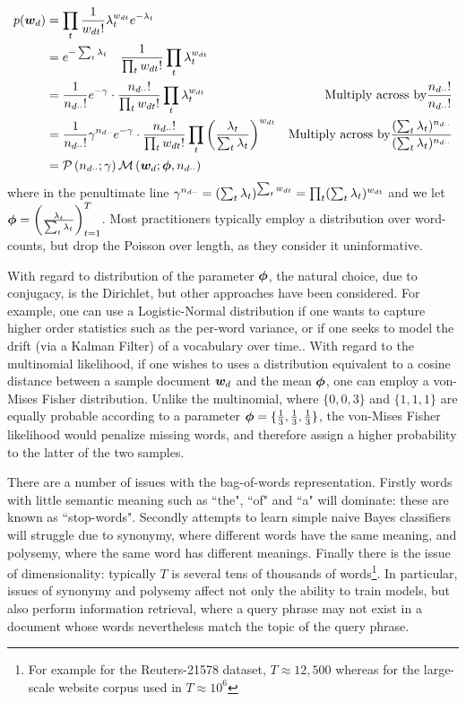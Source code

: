 \begin{align*}
p({ \bm w_d }) & = \prod_t \frac{1}{ {{ w_{dt} }!} } \lambda_t^{ w_{dt} } e^{-\lambda_t} \\
 &= e^{-\sum_t \lambda_t} \quad \frac{1}{ {\prod_t { w_{dt} }!} } \prod_t \lambda_t^{ w_{dt} } \\
&= \frac{1}{ {{ n_{d\cdot\cdot} } !} } e^{-\gamma} \cdot  \frac{{ n_{d\cdot\cdot} } !}{\prod_t { w_{dt} }!} \prod_t \lambda_t^{ w_{dt} } & \text{Multiply across by}\frac{{ n_{d\cdot\cdot} }!}{{ n_{d\cdot\cdot} }!} \\
&= \frac{1}{ {{ n_{d\cdot\cdot} } !} } \gamma^{ n_{d\cdot\cdot} } e^{-\gamma} \cdot  \frac{{ n_{d\cdot\cdot} } !}{\prod_t { w_{dt} }!} \prod_t \left(\frac{\lambda_t}{\sum_t \lambda_t}\right)^{ w_{dt} } & \text{Multiply across by}\frac{(\sum_t \lambda_t)^{ n_{d\cdot\cdot} }}{(\sum_t \lambda_t)^{ n_{d\cdot\cdot} }} \\
&= \mathcal{P}\left({ n_{d\cdot\cdot} }; \gamma\right) \mathcal{M}\left({ \bm w_d }; \bm \phi, { n_{d\cdot\cdot} }\right)
\end{align*}
where in the penultimate line $\gamma^{ n_{d\cdot\cdot} } = (\sum_t \lambda_t)^{\sum_t { w_{dt} }} = \prod_t (\sum_t \lambda_t)^{ w_{dt} }$ and we let $\bm \phi = \left(\frac{\lambda_t}{\sum_t \lambda_t}\right)_{t=1}^T$. Most practitioners typically employ a distribution over word-counts, but drop the Poisson over length, as they consider it uninformative.

With regard to distribution of the parameter $\bm \phi$, the natural choice, due to conjugacy, is the Dirichlet, but other approaches have been considered. For example, one can use a Logistic-Normal distribution if one wants to capture higher order statistics such as the per-word variance, or if one seeks to model the drift (via a Kalman Filter) of a vocabulary over time.\cite{Blei2006a}. With regard to the multinomial likelihood, if one wishes to uses a distribution equivalent to a cosine distance between a sample document ${ \bm w_d }$ and the mean $\bm \phi$, one can employ a von-Mises Fisher distribution\cite{Reisinger2010}. Unlike the multinomial, where $\{0, 0, 3\}$ and $\{1, 1, 1\}$ are equally probable according to a parameter $\bm \phi = \{\frac{1}{ {3} }, \frac{1}{ {3} }, \frac{1}{ {3} }\}$, the von-Mises Fisher likelihood would penalize missing words, and therefore assign a higher probability to the latter of the two samples.

There are a number of issues with the bag-of-words representation. Firstly words with little semantic meaning such as ``the", ``of" and ``a" will dominate: these are known as ``stop-words". Secondly attempts to learn simple naive Bayes classifiers\cite{Nigam2000} will struggle due to synonymy, where different words have the same meaning, and polysemy, where the same word has different meanings. Finally there is the issue of dimensionality: typically $T$ is several tens of thousands of words\footnote{For example for the Reuters-21578 dataset, $T\approx 12,500$ whereas for the large-scale website corpus used in\cite{Smola2010} $T \approx 10^6$}. In particular, issues of synonymy and polysemy affect not only the ability to train models, but also perform information retrieval, where a query phrase may not exist in a document whose words nevertheless match the topic of the query phrase.


